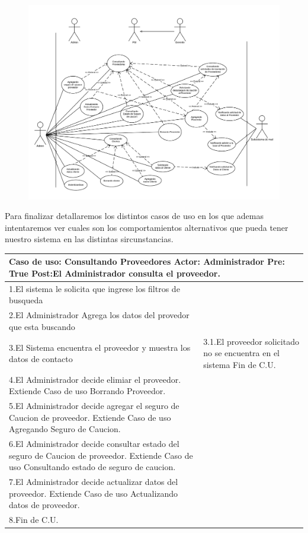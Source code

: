 \begin{figure}[H]
\includegraphics[width=\linewidth]{diag/viejos/cu6.pdf}
\end{figure}

Para finalizar detallaremos los distintos casos de uso en los que ademas intentaremos ver cuales son los comportamientos alternativos que pueda tener nuestro sistema en las distintas sircunstancias.

\begin{longtable}{| p{} | p{} |} 
    \hline
    \multicolumn{2}{|p{16cm}|}{
        \textbf{Caso de uso:} Consultando Proveedores \newline
        \textbf{Actor:} Administrador\newline
        \textbf{Pre:}  True\newline
        \textbf{Post:}El Administrador consulta el proveedor.
    }\\
    \hline
    1.El sistema le solicita que ingrese los filtros de busqueda  & \\
    \hline
    2.El Administrador Agrega los datos del provedor que esta buscando& \\
    \hline
    3.El Sistema encuentra el proveedor y muestra los datos de contacto & 3.1.El proveedor solicitado no se encuentra en el sistema \newline 3.2 Fin de C.U.  \\
    \hline
    4.El Administrador decide elimiar el proveedor. Extiende Caso de uso Borrando Proveedor.& \\
    \hline
    5.El Administrador decide agregar el seguro de Caucion de proveedor. Extiende Caso de uso Agregando Seguro de Caucion.& \\
    \hline
    6.El Administrador decide consultar estado del seguro de Caucion de proveedor. Extiende Caso de uso Consultando estado de seguro de caucion.& \\
    \hline
    7.El Administrador decide actualizar datos del proveedor. Extiende Caso de uso Actualizando datos de proveedor.& \\
    \hline
    8.Fin de C.U.& \\
    \hline
\end{longtable}

